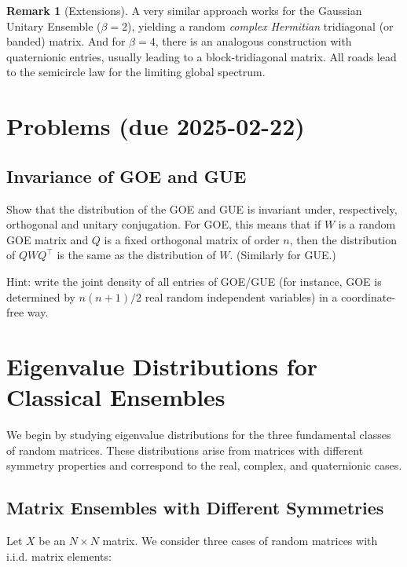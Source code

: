 \documentclass[letterpaper,11pt,oneside,reqno]{article}
\numberwithin{equation}{section}
\theoremstyle{definition}
\newtheorem{remark}[proposition]{Remark}
\begin{document}
\begin{remark}[Extensions]
A very similar approach works for the Gaussian Unitary Ensemble (\(\beta=2\)), yielding a random \emph{complex Hermitian} tridiagonal (or banded) matrix.  And for \(\beta=4\), there is an analogous construction with quaternionic entries, usually leading to a block-tridiagonal matrix.  All roads lead to the semicircle law for the limiting global spectrum.
\end{remark}


\appendix
\setcounter{section}{2}

\section{Problems (due 2025-02-22)}

\subsection{Invariance of GOE and GUE}
\label{prob:invariance_GOE_GUE}

Show that the distribution of the GOE and GUE is
invariant under, respectively, orthogonal and unitary conjugation.
For GOE, this means that if \(W\)
is a random GOE matrix and \(Q\) is a fixed orthogonal
matrix of order $n$, then the distribution
of \(QWQ^\top\) is the same as the distribution of \(W\).
(Similarly for GUE.)

\medskip
\noindent
Hint: write the joint density of all entries of GOE/GUE (for instance, GOE
is determined by $n(n+1)/2$ real random independent variables)
in a coordinate-free way.






\newpage
\section{Eigenvalue Distributions for Classical Ensembles}

We begin by studying eigenvalue distributions for the three fundamental classes of random matrices. These distributions arise from matrices with different symmetry properties and correspond to the real, complex, and quaternionic cases.

\subsection{Matrix Ensembles with Different Symmetries}

Let $X$ be an $N\times N$ matrix. We consider three cases of random matrices with i.i.d. matrix elements:
\end{document}
